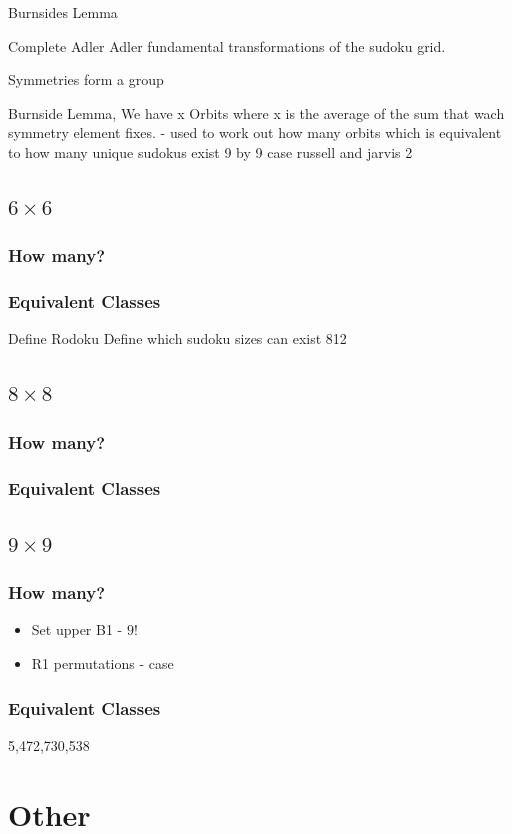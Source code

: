 \documentclass[a4paper,11pt]{report}
\begin{document}
Burnsides Lemma

Complete Adler Adler fundamental transformations of the sudoku grid.

Symmetries form a group 

Burnside Lemma,  We have x Orbits where x is the average of the sum that wach symmetry element fixes. - used to work out how many orbits which is equivalent to how many unique sudokus exist
9 by 9 case russell and jarvis 2

	\section{$6 \times 6$}
\subsection{How many?}
\subsection{Equivalent Classes}
Define Rodoku 
Define which sudoku sizes can exist
812
	\section{$8 \times 8$}
\subsection{How many?}
\subsection{Equivalent Classes}
	\section{$9 \times  9$}
\subsection{How many?}
\begin{itemize}
\item Set upper B1 - $9!$
\item R1 permutations - case
\end{itemize}
\subsection{Equivalent Classes}
5,472,730,538

\chapter{Other}



\end{document}
